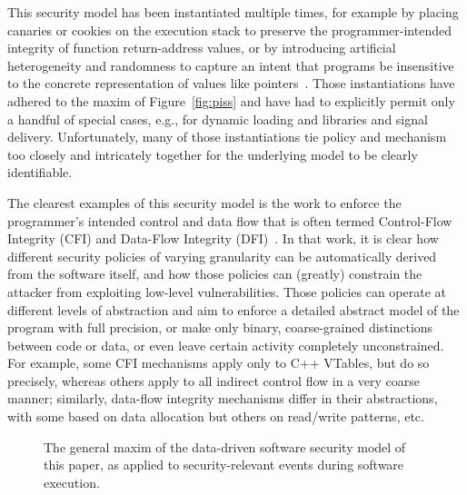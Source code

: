 \documentclass{IEEEtran}
\begin{document}
This security model has been instantiated multiple times, for example by placing canaries or cookies on the execution stack to preserve the programmer-intended integrity of function return-address values, or by introducing artificial heterogeneity and randomness to capture an intent that programs be insensitive to the concrete representation of values like pointers~\cite{lowLevelSoftwareSecurity}.
Those instantiations 
have adhered to the maxim of Figure~\ref{fig:piss}
and have had to explicitly permit only a handful of special 
cases, e.g., for dynamic loading and libraries and signal delivery.
Unfortunately, many of those instantiations tie policy and mechanism too closely and intricately together for the underlying model to be clearly identifiable.


The clearest examples of this security model is the work to enforce the programmer's intended control and data flow that is often termed Control-Flow Integrity (CFI) and Data-Flow Integrity (DFI)~\cite{programShepherd,CFI,SafeCODE,DFI,WIT,fwdCFI}.
In that work, it is clear how different security policies of varying granularity can be automatically derived from the software itself, and how those policies can (greatly) constrain the attacker from exploiting low-level vulnerabilities.
Those policies can
operate at different levels of abstraction and
aim to enforce a detailed abstract model of the program with full precision,
or make only binary, coarse-grained distinctions between code or data,
or even leave certain activity completely unconstrained.
For example, some CFI mechanisms apply only to C++ VTables, but do so precisely, whereas others apply to all indirect control flow in a very coarse manner;
similarly, data-flow integrity mechanisms differ in their abstractions, with some based on data allocation but others on read/write patterns, etc.


\begin{figure*}[t]
\centering
{}
\caption{The general maxim of the data-driven software security model of this paper, as applied to security-relevant events during software execution.}\label{fig:ddss}
\end{figure*}
\end{document}
